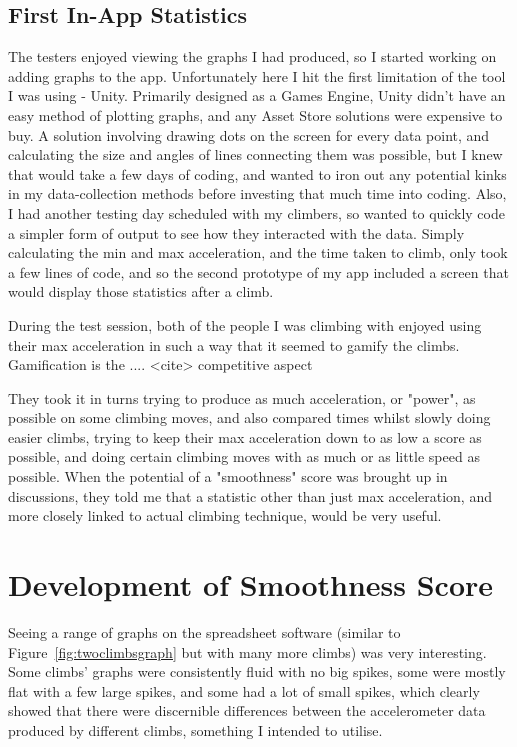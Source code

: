 \subsection{First In-App Statistics}
The testers enjoyed viewing the graphs I had produced, so I started working on adding graphs to the app.
Unfortunately here I hit the first limitation of the tool I was using - Unity.
Primarily designed as a Games Engine, Unity didn't have an easy method of plotting graphs, and any Asset Store solutions were expensive to buy. 
A solution involving drawing dots on the screen for every data point, and calculating the size and angles of lines connecting them was possible, but I knew that would take a few days of coding, and wanted to iron out any potential kinks in my data-collection methods before investing that much time into coding.
Also, I had another testing day scheduled with my climbers, so wanted to quickly code a simpler form of output to see how they interacted with the data.
Simply calculating the min and max acceleration, and the time taken to climb, only took a few lines of code, and so the second prototype of my app included a screen that would display those statistics after a climb.

During the test session, both of the people I was climbing with enjoyed using their max acceleration in such a way that it seemed to gamify the climbs.
Gamification is the .... <cite> 
competitive aspect

They took it in turns trying to produce as much acceleration, or "power", as possible on some climbing moves, and also compared times whilst slowly doing easier climbs, trying to keep their max acceleration down to as low a score as possible, and doing certain climbing moves with as much or as little speed as possible.
When the potential of a "smoothness" score was brought up in discussions, they told me that a statistic other than just max acceleration, and more closely linked to actual climbing technique, would be very useful.


\section{Development of Smoothness Score}
Seeing a range of graphs on the spreadsheet software (similar to Figure~\ref{fig:twoclimbsgraph} but with many more climbs) was very interesting.
Some climbs' graphs were consistently fluid with no big spikes, some were mostly flat with a few large spikes, and some had a lot of small spikes, which clearly showed that there were discernible differences between the accelerometer data produced by different climbs, something I intended to utilise.

